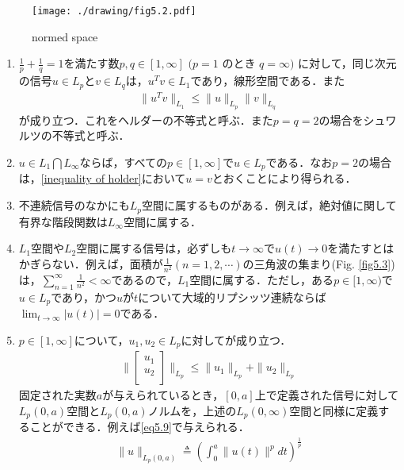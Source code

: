 \documentclass[a4paper,11pt,uplatex]{jsarticle} %
\theoremstyle{definition}	%
\newcommand{\figref}[1]{Fig. \ref{#1}}
\begin{document}
\begin{figure}[t]
    \centering
    \texttt{[image: ./drawing/fig5.2.pdf]}
    \caption{normed space }
    \label{fig5.2}
\end{figure}

\begin{tcolorbox}[title=補足事項,
drop small lifted shadow=black]
\begin{enumerate}
    \item
    $ \frac{1}{p} + \frac{1}{q} = 1 $を満たす数$p, q \in [1, \infty]$  $( p = 1 $ のとき $ q = \infty ) $ に対して，同じ次元の信号$u \in L_p$と$v \in L_q $は，$u^T v \in L_1$であり，線形空間である．また
    \begin{align}
    \label{inequality of holder}
    \| u^T v \| _{L_1} \leq \| u \|_{L_p} \| v \|_{L_q}
    \end{align}
    が成り立つ．これをヘルダーの不等式と呼ぶ．また$p = q = 2$の場合をシュワルツの不等式と呼ぶ．
    
    \item  $u \in L_1 \bigcap L_\infty $ならば，すべての$ p \in [1, \infty]$で$u \in L_p $である．なお$ p = 2 $の場合は，\eqref{inequality of holder}において$u = v$とおくことにより得られる．
    \item 不連続信号のなかにも$L_p$空間に属するものがある．例えば，絶対値に関して有界な階段関数は$L_\infty$空間に属する．
    \item $L_1$空間や$L_2$空間に属する信号は，必ずしも$t \to \infty$で$u(t) \to 0$を満たすとはかぎらない．例えば，面積が$\frac{1}{n^2}(n = 1, 2, \cdots)$の三角波の集まり(\figref{fig5.3})は，$\sum_{n = 1}^\infty \frac{1}{n^2} < \infty $であるので，$L_1$空間に属する．ただし，ある$p \in [1, \infty)$で$u \in L_p $であり，かつ$u$が$t$について大域的リプシッツ連続ならば$\lim_{t \to \infty} | u(t) | = 0$である．
    \item $p \in [1, \infty]$について，$u_1, u_2 \in L_p $に対してが成り立つ．
            \begin{align}
            \label{eq5.8}
            \|
            \begin{bmatrix}
                u_1 \\
                u_2 \\
            \end{bmatrix}
            \|_{L_p} \leq \| u_1 \|_{L_p} + \| u_2 \|_{L_p}
            \end{align}
            固定された実数$a$が与えられているとき，$[0, a]$上で定義された信号に対して$L_p (0, a)$空間と$L_p(0,a)$ノルムを，上述の$L_p(0,\infty)$空間と同様に定義することができる．例えば\eqref{eq5.9}で与えられる．
            \begin{align}
            \label{eq5.9}
            \| u \|_{L_p (0,a)} \triangleq ( \int_0^a \| u(t) \|^p dt )^{\frac{1}{p}}
            \end{align}
    \end{enumerate}
\end{tcolorbox}
\end{document}
